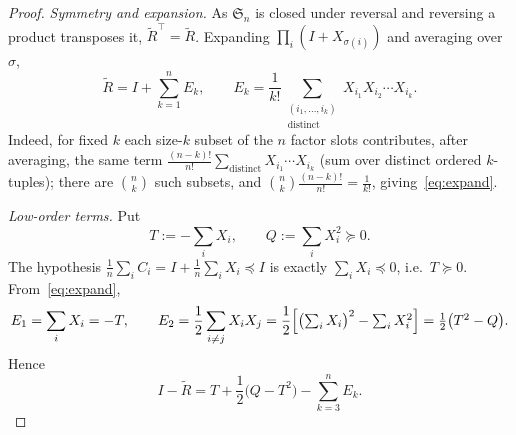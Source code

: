 \documentclass[11pt]{article}
\theoremstyle{definition}
\theoremstyle{remark}
\newcommand{\Sn}{\mathfrak{S}_n}
\newcommand{\psdle}{\preceq}
\newcommand{\psdge}{\succeq}
\begin{document}
\begin{proof}
\emph{Symmetry and expansion.} As $\Sn$ is closed under reversal and reversing a product transposes
it, $\widetilde R^\top=\widetilde R$. Expanding $\prod_i(I+X_{\sigma(i)})$ and averaging over $\sigma$,
\begin{equation}\label{eq:expand}
\widetilde R=I+\sum_{k=1}^n E_k,\qquad
E_k=\frac1{k!}\sum_{\substack{(i_1,\dots,i_k)\\ \text{distinct}}}X_{i_1}X_{i_2}\cdots X_{i_k}.
\end{equation}
Indeed, for fixed $k$ each size-$k$ subset of the $n$ factor slots contributes, after averaging,
the same term $\frac{(n-k)!}{n!}\sum_{\text{distinct}}X_{i_1}\cdots X_{i_k}$ (sum over distinct
ordered $k$-tuples); there are $\binom nk$ such subsets, and $\binom nk\frac{(n-k)!}{n!}=\frac1{k!}$,
giving~\eqref{eq:expand}.

\emph{Low-order terms.} Put
\[
T:=-\sum_iX_i,\qquad Q:=\sum_iX_i^2\psdge0.
\]
The hypothesis $\frac1n\sum_iC_i=I+\frac1n\sum_iX_i\psdle I$ is exactly $\sum_iX_i\psdle0$, i.e.\
$T\psdge0$. From~\eqref{eq:expand},
\[
E_1=\sum_iX_i=-T,\qquad
E_2=\frac12\sum_{i\ne j}X_iX_j=\frac12\Bigl[\bigl(\textstyle\sum_iX_i\bigr)^2-\sum_iX_i^2\Bigr]
=\frac12\bigl(T^2-Q\bigr).
\]
Hence
\begin{equation}\label{eq:IR}
I-\widetilde R=T+\frac12\bigl(Q-T^2\bigr)-\sum_{k=3}^n E_k.
\end{equation}


\end{proof}
\end{document}
